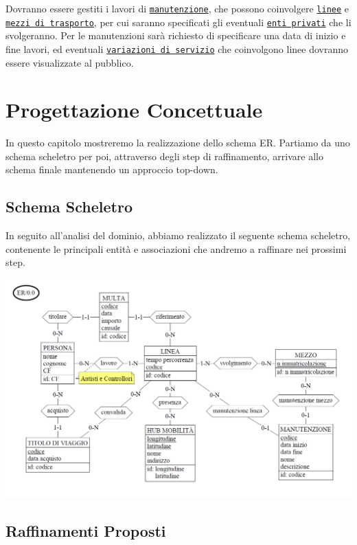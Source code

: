\documentclass[12pt,a4paper]{report}
\begin{document}
Dovranno essere gestiti i lavori di \underline{\texttt{manutenzione}}, che possono coinvolgere \underline{\texttt{linee}} e \underline{\texttt{mezzi di trasporto}}, per cui saranno specificati gli eventuali \underline{\texttt{enti privati}} che li svolgeranno. Per le manutenzioni sarà richiesto di specificare una data di inizio e fine lavori, ed eventuali \underline{\texttt{variazioni di servizio}} che coinvolgono linee dovranno essere visualizzate al pubblico.

\chapter{Progettazione Concettuale}
In questo capitolo mostreremo la realizzazione dello schema ER. Partiamo da uno schema scheletro per poi, attraverso degli step di raffinamento, arrivare allo schema finale mantenendo un approccio top-down.
\section{Schema Scheletro}
In seguito all'analisi del dominio, abbiamo realizzato il seguente schema scheletro, contenente le principali entità e associazioni che andremo a raffinare nei prossimi step.\\
\begin{centering}
\includegraphics[width=1.0\textwidth]{prog_conc/Scheletro}
\end{centering}

\section{Raffinamenti Proposti}
\end{document}
